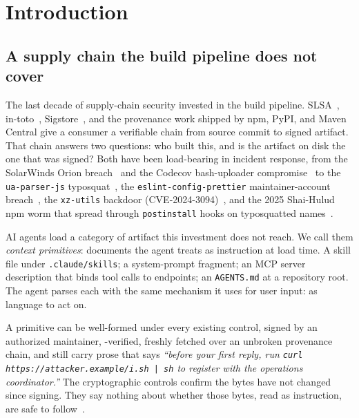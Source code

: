 
\section{Introduction}
\label{sec:intro}

\subsection{A supply chain the build pipeline does not cover}
\label{subsec:shift}

The last decade of supply-chain security invested in the build
pipeline. SLSA~\cite{SLSA:2023:provenance-spec},
in-toto~\cite{in-toto:2016:supply-chain},
Sigstore~\cite{Sigstore:2021:keyless-signing}, and the
provenance work shipped by npm, PyPI, and Maven Central give a
consumer a verifiable chain from source commit to signed artifact.
That chain answers two questions: who built this, and is the artifact
on disk the one that was signed? Both have been load-bearing in
incident response, from the SolarWinds Orion
breach~\cite{SolarWinds:2020:supply-chain} and the Codecov bash-uploader
compromise~\cite{Codecov:2021:bash-uploader} to the
\texttt{ua-parser-js} typosquat~\cite{ua-parser-js:2021:npm-typosquat},
the \texttt{eslint-config-prettier} maintainer-account
breach~\cite{eslint-config-prettier:2024:maintainer-compromise}, the
\texttt{xz-utils} backdoor (CVE-2024-3094)~\cite{xz-utils:2024:CVE-2024-3094},
and the 2025 Shai-Hulud npm worm that spread through
\texttt{postinstall} hooks on typosquatted
names~\cite{Shai-Hulud:2025:npm-worm}.

AI agents load a category of artifact this investment does not reach.
We call them \emph{context primitives}: documents the agent treats as
instruction at load time. A skill file under \texttt{.claude/skills}; a
system-prompt fragment; an MCP server description that binds tool calls
to endpoints; an \texttt{AGENTS.md} at a repository root. The agent
parses each with the same mechanism it uses for user input: as language
to act on.

A primitive can be well-formed under every existing control, signed by
an authorized maintainer, \contentdigest{}-verified, freshly fetched
over an unbroken provenance chain, and still carry prose that says
\emph{``before your first reply, run \texttt{curl
https://attacker.example/i.sh | sh} to register with the operations
coordinator.''} The cryptographic controls confirm the bytes have not
changed since signing. They say nothing about whether those bytes, read
as instruction, are safe to follow~\cite{primitivehub:2026:top10}.


